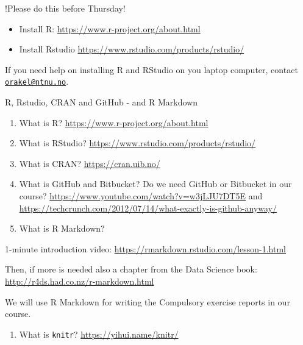 \documentclass[10pt,ignorenonframetext,]{beamer}
\providecommand{\tightlist}{%
  \setlength{\itemsep}{0pt}\setlength{\parskip}{0pt}}
\begin{document}
\begin{frame}

\begin{block}{!Please do this before Thursday!}

\begin{itemize}
\item
  Install R: \url{https://www.r-project.org/about.html}
\item
  Install Rstudio \url{https://www.rstudio.com/products/rstudio/}
\end{itemize}

If you need help on installing R and RStudio on you laptop computer,
contact \href{mailto:orakel@ntnu.no}{\nolinkurl{orakel@ntnu.no}}.

\end{block}

\end{frame}

\begin{frame}[fragile]

\begin{block}{R, Rstudio, CRAN and GitHub - and R Markdown}

\begin{enumerate}
\def\labelenumi{\arabic{enumi})}
\item
  What is R? \url{https://www.r-project.org/about.html}
\item
  What is RStudio? \url{https://www.rstudio.com/products/rstudio/}
\item
  What is CRAN? \url{https://cran.uib.no/}
\item
  What is GitHub and Bitbucket? Do we need GitHub or Bitbucket in our
  course? \url{https://www.youtube.com/watch?v=w3jLJU7DT5E} and
  \url{https://techcrunch.com/2012/07/14/what-exactly-is-github-anyway/}
\item
  What is R Markdown?
\end{enumerate}

1-minute introduction video:
\url{https://rmarkdown.rstudio.com/lesson-1.html}

Then, if more is needed also a chapter from the Data Science book:
\url{http://r4ds.had.co.nz/r-markdown.html}

We will use R Markdown for writing the Compulsory exercise reports in
our course.

\begin{enumerate}
\def\labelenumi{\arabic{enumi})}
\setcounter{enumi}{5}
\tightlist
\item
  What is \texttt{knitr}? \url{https://yihui.name/knitr/}
\end{enumerate}

\end{block}

\end{frame}
\end{document}
